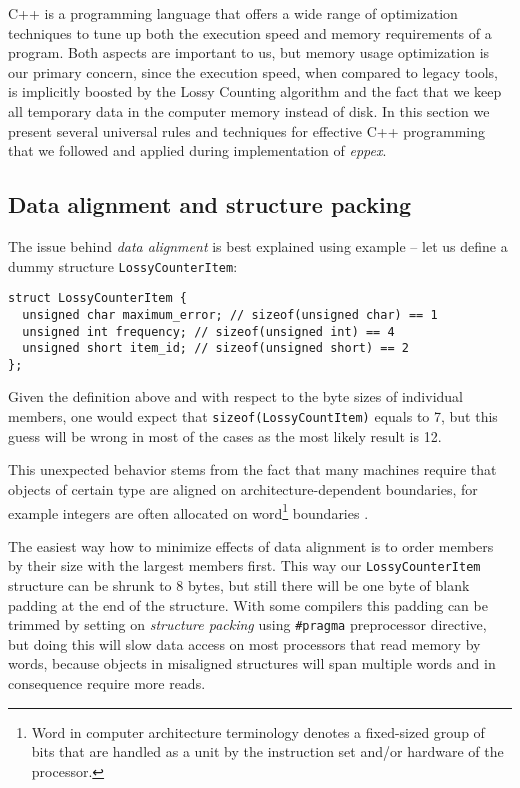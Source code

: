 C++ is a programming language that offers a wide range of optimization techniques to
tune up both the execution speed and memory requirements of a program.
Both aspects are important to us, but memory usage optimization is our primary concern,
since the execution speed, when compared to legacy tools, is implicitly boosted by
the Lossy Counting algorithm and the fact that we keep all temporary data in the computer
memory instead of disk.
In this section we present several universal rules and techniques for effective C++
programming that we followed and applied during implementation of \emph{eppex}.

\subsection{Data alignment and structure packing}

The issue behind \emph{data alignment} is best explained using example
-- let us define a dummy structure \verb|LossyCounterItem|:

\begin{verbatim}
struct LossyCounterItem {
  unsigned char maximum_error; // sizeof(unsigned char) == 1
  unsigned int frequency; // sizeof(unsigned int) == 4
  unsigned short item_id; // sizeof(unsigned short) == 2
};
\end{verbatim}

Given the definition above and with respect to the byte sizes of individual members,
one would expect that \verb|sizeof(LossyCountItem)| equals to 7, but this guess
will be wrong in most of the cases as the most likely result is 12.

This unexpected behavior stems from the fact that many machines require that
objects of certain type are aligned on architecture-dependent boundaries,
for example integers are often allocated on word\footnote{Word in computer
architecture terminology denotes a fixed-sized group of bits that are handled
as a unit by the instruction  set and/or hardware of the processor.} boundaries
\citep[Chapter 5]{stroustrup:cplusplus}.

The easiest way how to minimize effects of data alignment is to order members
by their size with the largest members first.
This way our \verb|LossyCounterItem| structure can be shrunk to 8 bytes,
but still there will be one byte of blank padding at the end of the structure.
With some compilers this padding can be trimmed by setting on \emph{structure packing}
using \verb|#pragma| preprocessor directive, but doing this will slow data access
on most processors that read memory by words, because objects in misaligned structures
will span multiple words and in consequence require more reads.

